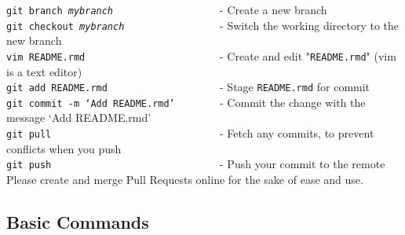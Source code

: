 \documentclass{article}
\begin{document}
\noindent
\texttt{git branch \textit{mybranch}}\verb+                   +- Create a new branch \\
\texttt{git checkout \textit{mybranch}}\verb+                 +- Switch the working directory to the new branch\\
\texttt{vim README.rmd}\verb+                        +- Create and edit "\texttt{README.rmd}" (vim is a text editor)\\
\texttt{git add README.rmd}\verb+                    +- Stage \texttt{README.rmd} for commit\\
\texttt{git commit -m `Add README.rmd'}\verb+        +- Commit the change with the message `Add README.rmd'\\
\texttt{git pull}\verb+                              +- Fetch any commits, to prevent conflicts when you push\\
\texttt{git push}\verb+                              +- Push your commit to the remote\\

\noindent
Please create and merge Pull Requests online for the sake of ease and use.

\pagebreak

\subsection{Basic Commands}
\end{document}
